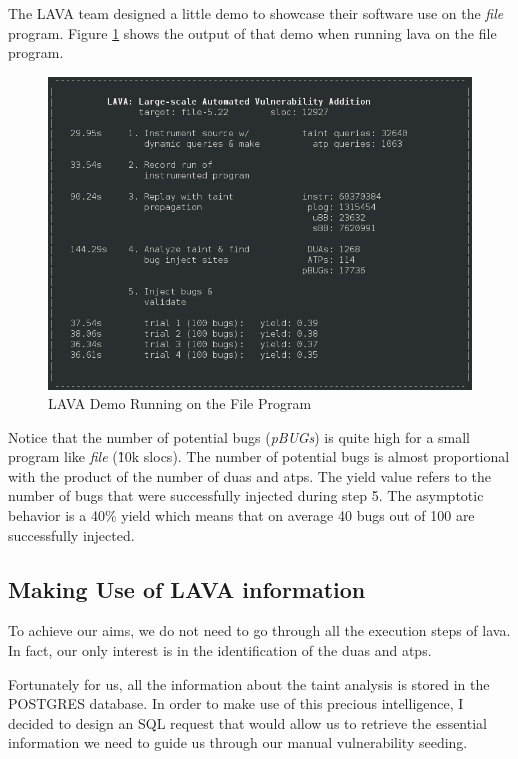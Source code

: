The LAVA team designed a little demo to showcase their software use on the \emph{file} program. Figure \ref{fig:lava-demo} shows the output of that demo when running \gls{lava} on the file program.

\begin{figure}[ht]
    \centering
    \includegraphics[scale=0.5]{figures/lava-demo}
    \caption{LAVA Demo Running on the File Program}
    \label{fig:lava-demo}
\end{figure}

Notice that the number of potential bugs (\emph{pBUGs}) is quite high for a small program like \emph{file} (\~10k \glspl{sloc}). The number of potential bugs is almost proportional with the product of the number of \glspl{dua} and \glspl{atp}. The yield value refers to the number of bugs that were successfully injected during step 5. The asymptotic behavior is a 40\% yield which means that on average 40 bugs out of 100 are successfully injected.

\subsection{Making Use of LAVA information}

To achieve our aims, we do not need to go through all the execution steps of \gls{lava}. In fact, our only interest is in the identification of the \glspl{dua} and \glspl{atp}.

Fortunately for us, all the information about the taint analysis is stored in the POSTGRES database. In order to make use of this precious intelligence, I decided to design an SQL request that would allow us to retrieve the essential information we need to guide us through our manual vulnerability seeding.

